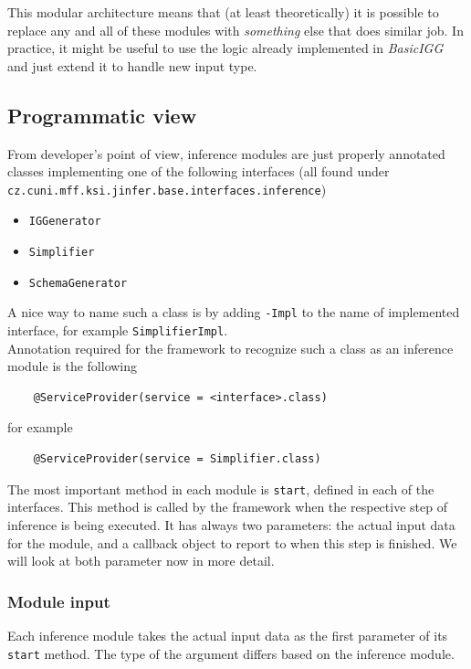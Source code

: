 \documentclass[a4paper,10pt,oneside]{article}
\newcommand{\code}[1]{\texttt{#1}}
\begin{document}
This modular architecture means that (at least theoretically) it is possible to replace any and all of these modules with \textit{something} else that does similar job. In practice, it might be useful to use the logic already implemented in \textit{BasicIGG} and just extend it to handle new input type.


\subsection{Programmatic view}

From developer's point of view, inference modules are just properly annotated classes implementing one of the following interfaces (all found under \code{cz.cuni.mff.ksi.jinfer.base.interfaces.inference})

\begin{itemize}
	\item \code{IGGenerator}
	\item \code{Simplifier}
	\item \code{SchemaGenerator}
\end{itemize}

A nice way to name such a class is by adding \code{-Impl} to the name of implemented interface, for example \code{SimplifierImpl}.\\


Annotation required for the framework to recognize such a class as an inference module is the following
\begin{verbatim}
	@ServiceProvider(service = <interface>.class)
\end{verbatim}
for example
\begin{verbatim}
	@ServiceProvider(service = Simplifier.class)
\end{verbatim}

The most important method in each module is \code{start}, defined in each of the interfaces. This method is called by the framework when the respective step of inference is being executed. It has always two parameters: the actual input data for the module, and a callback object to report to when this step is finished. We will look at both parameter now in more detail. 

\subsubsection{Module input}
Each inference module takes the actual input data as the first parameter of its \code{start} method. The type of the argument differs based on the inference module.\\
\end{document}
